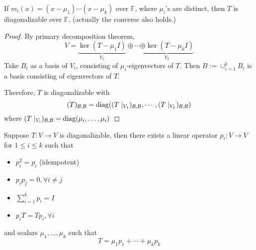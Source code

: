 \begin{corollary}
If $m_i(x) = (x-\mu_1)\cdots(x-\mu_k)$ over $\mathbb{F}$, where $\mu_i$'s are distinct, then $T$ is diagonalizable over $\mathbb{F}$. (actually the converse also holds.)
\end{corollary}
\begin{proof}
By primary decomposition theorem,
\[
V=\underbrace{\ker(T-\mu_1 I)}_{V_1}\oplus\cdots\underbrace{\oplus\ker(T-\mu_kI)}_{V_k}
\]
Take $B_i$ as a basis of $V_i$, consisting of $\mu_i$-eigenvectors of $T$.
Then $B:=\cup_{i=1}^kB_i$ is a basis consisting of eigenvectors of $T$.

Therefore, $T$ is diagonalizable with 
\[
(T)_{\mathcal{B},\mathcal{B}}
=
\operatorname{diag}((T\mid_{V_1})_{\mathcal{B},\mathcal{B}},\cdots,(T\mid_{V_k})_{\mathcal{B},\mathcal{B}})
\]
where $(T\mid_{V_i})_{\mathcal{B},\mathcal{B}}=\operatorname{diag}(\mu_i,\dots,\mu_i)$
\end{proof}

\begin{corollary}
Suppose $T:V\to V$ is diagonalizable, then there exists a linear operator $p_i:V\to V$ for $1\le i\le k$ such that
\begin{itemize}
\item
$p_i^2=p_i$ (idempotent)
\item
$p_ip_j=0,\forall i\ne j$
\item
$\sum_{i=1}^kp_i=I$
\item
$p_iT=Tp_i,\forall i$
\end{itemize}
and scalars $\mu_1,\dots,\mu_k$ such that
\[
T=\mu_1p_1+\cdots+\mu_kp_k
\]
\end{corollary}

